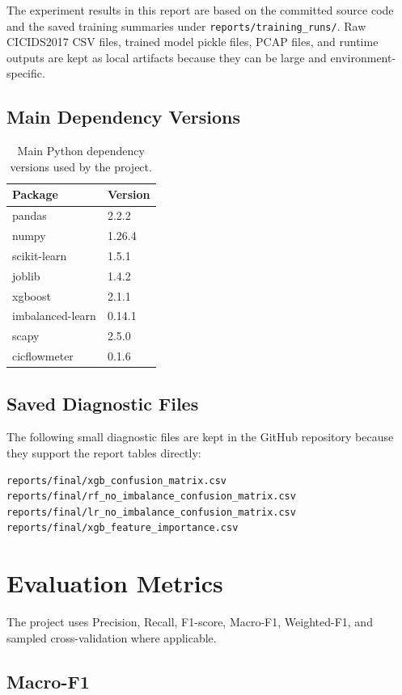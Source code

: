 \documentclass[12pt,a4paper]{article}
\begin{document}
The experiment results in this report are based on the committed source code and the saved training summaries under \texttt{reports/training\_runs/}. Raw CICIDS2017 CSV files, trained model pickle files, PCAP files, and runtime outputs are kept as local artifacts because they can be large and environment-specific.

\subsection{Main Dependency Versions}

\begin{longtable}{l l}
\caption{Main Python dependency versions used by the project.}\\
\toprule
\textbf{Package} & \textbf{Version} \\
\midrule
pandas & 2.2.2 \\
numpy & 1.26.4 \\
scikit-learn & 1.5.1 \\
joblib & 1.4.2 \\
xgboost & 2.1.1 \\
imbalanced-learn & 0.14.1 \\
scapy & 2.5.0 \\
cicflowmeter & 0.1.6 \\
\bottomrule
\end{longtable}

\subsection{Saved Diagnostic Files}

The following small diagnostic files are kept in the GitHub repository because they support the report tables directly:

\begin{lstlisting}
reports/final/xgb_confusion_matrix.csv
reports/final/rf_no_imbalance_confusion_matrix.csv
reports/final/lr_no_imbalance_confusion_matrix.csv
reports/final/xgb_feature_importance.csv
\end{lstlisting}

\section{Evaluation Metrics}

The project uses Precision, Recall, F1-score, Macro-F1, Weighted-F1, and sampled cross-validation where applicable.

\subsection{Macro-F1}
\end{document}

